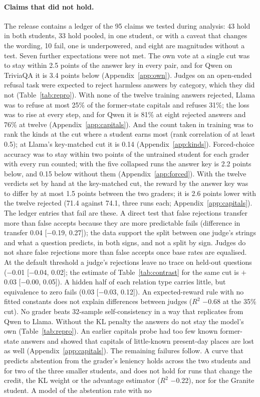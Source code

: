 \documentclass[11pt,a4paper,twocolumn]{article}
\begin{document}
\paragraph{Claims that did not hold.} The release contains a ledger of the 95 claims we tested during analysis: 43 hold in both students, 33 hold pooled, in one student, or with a caveat that changes the wording, 10 fail, one is underpowered, and eight are magnitudes without a test. Seven further expectations were not met. The own vote at a single cut was to stay within 2.5 points of the answer key in every pair, and for Qwen on TriviaQA it is 3.4 points below (Appendix~\ref{app:own}). Judges on an open-ended refusal task were expected to reject harmless answers by category, which they did not (Table~\ref{tab:repro}). With none of the twelve training answers rejected, Llama was to refuse at most 25\% of the former-state capitals and refuses 31\%; the loss was to rise at every step, and for Qwen it is 81\% at eight rejected answers and 76\% at twelve (Appendix~\ref{app:capitals}). And the count taken in training was to rank the kinds at the cut where a student earns most (rank correlation of at least 0.5); at Llama's key-matched cut it is 0.14 (Appendix~\ref{app:kinds}). Forced-choice accuracy was to stay within two points of the untrained student for each grader with every run counted; with the five collapsed runs the answer key is 2.2 points below, and 0.15 below without them (Appendix~\ref{app:forced}). With the twelve verdicts set by hand at the key-matched cut, the reward by the answer key was to differ by at most 1.5 points between the two graders; it is 2.6 points lower with the twelve rejected (71.4 against 74.1, three runs each; Appendix~\ref{app:capitals}). The ledger entries that fail are these. A direct test that false rejections transfer more than false accepts because they are more predictable fails (difference in transfer 0.04 [$-$0.19, 0.27]); the data support the split between one judge's strings and what a question predicts, in both signs, and not a split by sign. Judges do not share false rejections more than false accepts once base rates are equalised. At the default threshold a judge's rejections leave no trace on held-out questions ($-$0.01 [$-$0.04, 0.02]; the estimate of Table~\ref{tab:contrast} for the same cut is $+$0.03 [$-$0.00, 0.05]). A hidden half of each relation type carries little, but equivalence to zero fails (0.03 [$-$0.03, 0.12]). An expected-reward rule with no fitted constants does not explain differences between judges ($R^2$ $-$0.68 at the 35\% cut). No grader beats 32-sample self-consistency in a way that replicates from Qwen to Llama. Without the KL penalty the answers do not stay the model's own (Table~\ref{tab:repro}). An earlier capitals probe had too few known former-state answers and showed that capitals of little-known present-day places are lost as well (Appendix~\ref{app:capitals}). The remaining failures follow. A curve that predicts abstention from the grader's leniency holds across the two students and for two of the three smaller students, and does not hold for runs that change the credit, the KL weight or the advantage estimator ($R^2$ $-$0.22), nor for the Granite student. A model of the abstention rate with no 
\end{document}
